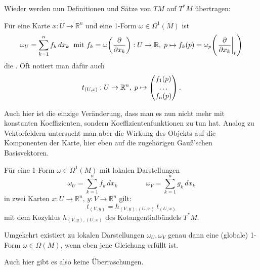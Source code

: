 \documentclass[../H_Analysis_main.tex]{subfiles}
\begin{document}
Wieder werden nun Definitionen und Sätze von $TM$ auf $T^* M$ übertragen:
\begin{defi}
Für eine Karte $x: U \rightarrow \mathbb{R}^n$ und eine 1-Form $\omega \in \Omega^1(M)$ ist
\begin{equation}
\omega_U = \sum_{k = 1}^n f_k \, dx_k \; \text{ mit } f_k = \omega\qty(\pdv{x_k}): U \rightarrow \mathbb{R}, \; p \mapsto f_k(p) = \omega_p\qty(\eval{\pdv{x_k}}_p)
\end{equation}
die . Oft notiert man dafür auch
\begin{equation}
t_{(U, x)}: U \rightarrow \mathbb{R}^n, \; p \mapsto \mqty(f_1(p) \\ \dots \\ f_n(p)) \, .
\end{equation}
\end{defi}
Auch hier ist die einzige Veränderung, dass man es nun nicht mehr mit konstanten Koeffizienten, sondern Koeffizientenfunktionen zu tun hat. Analog zu Vektorfeldern untersucht man aber die Wirkung des Objekts auf die Komponenten der Karte, hier eben auf die zugehörigen Gauß'schen Basisvektoren.


\begin{satz}
Für eine 1-Form $\omega \in \Omega^1(M)$ mit lokalen Darstellungen
\begin{equation*}
\omega_U = \sum_{k = 1}^n f_k \, dx_k \qquad \qquad \omega_V = \sum_{k = 1}^n g_k \, dx_k
\end{equation*}
in zwei Karten $x: U \rightarrow \mathbb{R}^n, \, y: V \rightarrow \mathbb{R}^n$ gilt:
\begin{equation}
t_{(V, y)} = h_{(V, y), (U, x)} \, t_{(U, x)}
\end{equation}
mit dem Kozyklus $h_{(V, y), (U, x)}$ des Kotangentialbündels $T^*M$.

Umgekehrt existiert zu lokalen Darstellungen $\omega_U, \omega_V$ genau dann eine (globale) 1-Form $\omega \in \Omega(M)$, wenn eben jene Gleichung erfüllt ist.
\end{satz}
Auch hier gibt es also keine Überraschungen.
\end{document}
